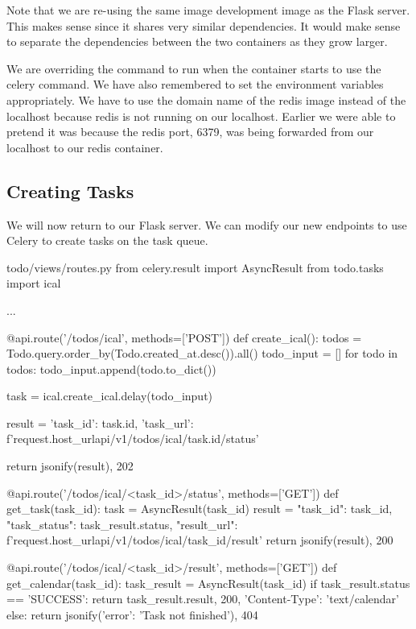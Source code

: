 \documentclass{csse4400}
\begin{document}
Note that we are re-using the same image development image as the Flask server.
This makes sense since it shares very similar dependencies.
It would make sense to separate the dependencies between the two containers as they grow larger.

We are overriding the command to run when the container starts to use the celery command.
We have also remembered to set the environment variables appropriately.
We have to use the domain name of the redis image instead of the localhost because redis is not running on our localhost.
Earlier we were able to pretend it was because the redis port, 6379, was being forwarded from our localhost to our redis container.

\subsection{Creating Tasks}

We will now return to our Flask server.
We can modify our new endpoints to use Celery to create tasks on the task queue.

\begin{code}[language=python,numbers=none]{todo/views/routes.py}
from celery.result import AsyncResult
from todo.tasks import ical

...

@api.route('/todos/ical', methods=['POST'])
def create_ical():
    todos = Todo.query.order_by(Todo.created_at.desc()).all()
    todo_input = []
    for todo in todos:
        todo_input.append(todo.to_dict())

    task = ical.create_ical.delay(todo_input)

    result = {
        'task_id': task.id,
        'task_url': f'{request.host_url}api/v1/todos/ical/{task.id}/status'
    }

    return jsonify(result), 202

@api.route('/todos/ical/<task_id>/status', methods=['GET'])
def get_task(task_id):
    task = AsyncResult(task_id)
    result = {
        "task_id": task_id,
        "task_status": task_result.status,
        "result_url": f'{request.host_url}api/v1/todos/ical/{task_id}/result'
    }
    return jsonify(result), 200

@api.route('/todos/ical/<task_id>/result', methods=['GET'])
def get_calendar(task_id):
    task_result = AsyncResult(task_id)
    if task_result.status == 'SUCCESS':
        return task_result.result, 200, {'Content-Type': 'text/calendar'}
    else:
        return jsonify({'error': 'Task not finished'}), 404
\end{code}
\end{document}
